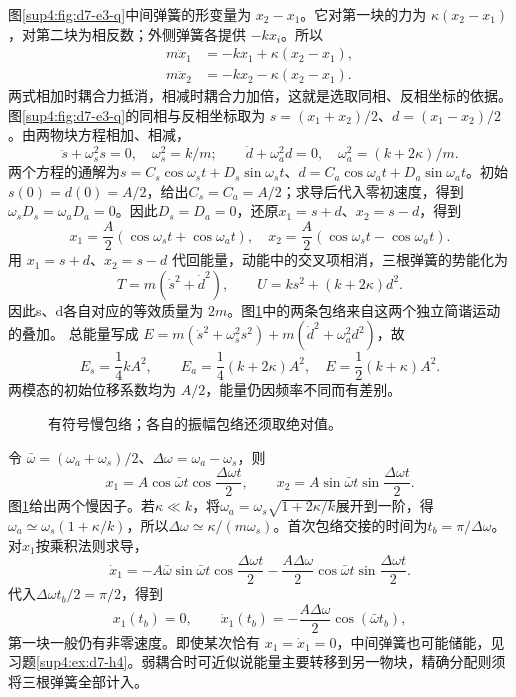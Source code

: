 \begin{solution}
图\ref{sup4:fig:d7-e3-q}中间弹簧的形变量为 $x_2-x_1$。它对第一块的力为 $\kappa(x_2-x_1)$，对第二块为相反数；外侧弹簧各提供 $-kx_i$。所以
\[
\begin{aligned}
m\ddot x_1&=-kx_1+\kappa(x_2-x_1),\\
m\ddot x_2&=-kx_2-\kappa(x_2-x_1).
\end{aligned}
\]
两式相加时耦合力抵消，相减时耦合力加倍，这就是选取同相、反相坐标的依据。
图\ref{sup4:fig:d7-e3-q}的同相与反相坐标取为 $s=(x_1+x_2)/2$、$d=(x_1-x_2)/2$。由两物块方程相加、相减，
\[
\ddot s+\omega_s^2s=0,\quad \omega_s^2=k/m;
\qquad \ddot d+\omega_a^2d=0,\quad \omega_a^2=(k+2\kappa)/m.
\]
两个方程的通解为$s=C_s\cos\omega_st+D_s\sin\omega_st$、$d=C_a\cos\omega_at+D_a\sin\omega_at$。初始$s(0)=d(0)=A/2$，给出$C_s=C_a=A/2$；求导后代入零初速度，得到$\omega_sD_s=\omega_aD_a=0$。因此$D_s=D_a=0$，还原$x_1=s+d$、$x_2=s-d$，得到
\[
\boxed{x_1=\frac A2(\cos\omega_st+\cos\omega_at),\quad
x_2=\frac A2(\cos\omega_st-\cos\omega_at).}
\]
用 $x_1=s+d$、$x_2=s-d$ 代回能量，动能中的交叉项相消，三根弹簧的势能化为
\[
T=m(\dot s^2+\dot d^2),\qquad U=ks^2+(k+2\kappa)d^2.
\]
因此s、d各自对应的等效质量为 $2m$。图\ref{sup4:fig:d7-e3-s}中的两条包络来自这两个独立简谐运动的叠加。
总能量写成 $E=m(\dot s^2+\omega_s^2s^2)+m(\dot d^2+\omega_a^2d^2)$，故
\[
E_s=\frac14kA^2,\qquad E_a=\frac14(k+2\kappa)A^2,
\quad E=\frac12(k+\kappa)A^2.
\]
两模态的初始位移系数均为 $A/2$，能量仍因频率不同而有差别。
\begin{figure}[H]\centering
{}
\caption{有符号慢包络；各自的振幅包络还须取绝对值。}\label{sup4:fig:d7-e3-s}
\end{figure}
令 $\bar\omega=(\omega_a+\omega_s)/2$、$\Delta\omega=\omega_a-\omega_s$，则
\[
x_1=A\cos\bar\omega t\cos\frac{\Delta\omega t}{2},\qquad
x_2=A\sin\bar\omega t\sin\frac{\Delta\omega t}{2}.
\]
图\ref{sup4:fig:d7-e3-s}给出两个慢因子。若$\kappa\ll k$，将$\omega_a=\omega_s\sqrt{1+2\kappa/k}$展开到一阶，得$\omega_a\simeq\omega_s(1+\kappa/k)$，所以$\Delta\omega\simeq\kappa/(m\omega_s)$。首次包络交接的时间为$t_b=\pi/\Delta\omega$。对$x_1$按乘积法则求导，
\[
\dot x_1=-A\bar\omega\sin\bar\omega t\cos\frac{\Delta\omega t}{2}
-\frac{A\Delta\omega}{2}\cos\bar\omega t\sin\frac{\Delta\omega t}{2}.
\]
代入$\Delta\omega t_b/2=\pi/2$，得到
\[
x_1(t_b)=0,\qquad
\dot x_1(t_b)=-\frac{A\Delta\omega}{2}\cos(\bar\omega t_b),
\]
第一块一般仍有非零速度。即使某次恰有 $x_1=\dot x_1=0$，中间弹簧也可能储能，见习题\ref{sup4:ex:d7-h4}。弱耦合时可近似说能量主要转移到另一物块，精确分配则须将三根弹簧全部计入。
\end{solution}



